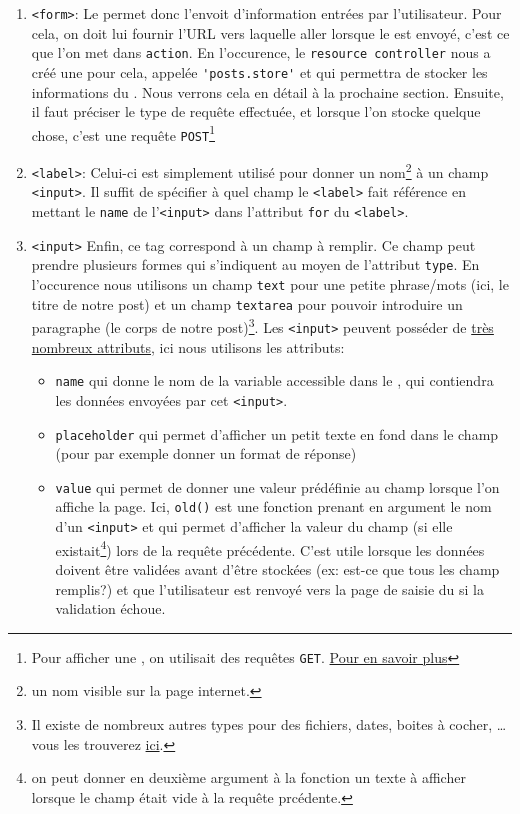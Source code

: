 \documentclass[internal]{nhitec_design}
\begin{document}
\begin{enumerate}
    \item \verb|<form>|: Le \form{} permet donc l'envoit d'information entrées par l'utilisateur. Pour cela, on doit lui fournir l'URL vers laquelle aller lorsque le \form{} est envoyé, c'est ce que l'on met dans \verb|action|. En l'occurence, le \texttt{resource controller} nous a créé une \route{} pour cela, appelée \verb|'posts.store'| et qui permettra de stocker les informations du \form{}. Nous verrons cela en détail à la prochaine section. Ensuite, il faut préciser le type de requête effectuée, et lorsque l'on stocke quelque chose, c'est une requête \verb|POST|\footnote{Pour afficher une \blade, on utilisait des requêtes \verb|GET|. \href{https://developer.mozilla.org/fr/docs/Web/HTTP/Methods}{Pour en savoir plus}}
    \item \verb|<label>|: Celui-ci est simplement utilisé pour donner un nom\footnote{un nom visible sur la page internet.} à un champ \verb|<input>|. Il suffit de spécifier à quel champ le \verb|<label>| fait référence en mettant le \verb|name| de l'\verb|<input>| dans l'attribut \verb|for| du \verb|<label>|.
    \item \verb|<input>| Enfin, ce tag correspond à un champ à remplir. Ce champ peut prendre plusieurs formes qui s'indiquent au moyen de l'attribut \verb|type|. En l'occurence nous utilisons un champ \verb|text| pour une petite phrase/mots (ici, le titre de notre post) et un champ \verb|textarea| pour pouvoir introduire un paragraphe (le corps de notre post)\footnote{Il existe de nombreux autres types pour des fichiers, dates, boites à cocher, \ldots vous les trouverez \href{https://developer.mozilla.org/en-US/docs/Web/HTML/Element/input#input_types}{ici}.}. Les \verb|<input>| peuvent posséder de \href{https://developer.mozilla.org/en-US/docs/Web/HTML/Element/input#attributes}{très nombreux attributs}, ici nous utilisons les attributs:
    \begin{itemize}
        \item \verb|name| qui donne le nom de la variable accessible dans le \controller{}, qui contiendra les données envoyées par cet \verb|<input>|.
        \item \verb|placeholder| qui permet d'afficher un petit texte en fond dans le champ (pour par exemple donner un format de réponse)
        \item \verb|value| qui permet de donner une valeur prédéfinie au champ lorsque l'on affiche la page. Ici, \verb|old()| est une fonction prenant en argument le nom d'un \verb|<input>| et qui permet d'afficher la valeur du champ (si elle existait\footnote{on peut donner en deuxième argument à la fonction un texte à afficher lorsque le champ était vide à la requête prcédente.}) lors de la requête précédente. C'est utile lorsque les données doivent être validées avant d'être stockées (ex: est-ce que tous les champ remplis?) et que l'utilisateur est renvoyé vers la page de saisie du \form{} si la validation échoue.
    \end{itemize}
\end{enumerate}
\end{document}

